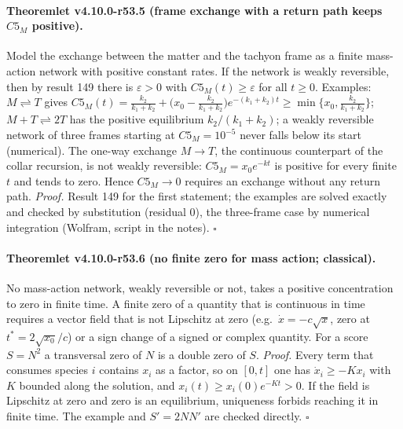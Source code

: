 \paragraph{Theoremlet v4.10.0-r53.5 (frame exchange with a return path keeps \(C5_M\) positive).}
Model the exchange between the matter and the tachyon frame as a finite mass-action network with positive constant rates.  If the network is weakly
reversible, then by result 149 there is \(\varepsilon>0\) with \(C5_M(t)\ge\varepsilon\) for all \(t\ge0\).  Examples: \(M\rightleftharpoons T\) gives
\(C5_M(t)=\tfrac{k_2}{k_1+k_2}+\bigl(x_0-\tfrac{k_2}{k_1+k_2}\bigr)e^{-(k_1+k_2)t}\ge\min\{x_0,\tfrac{k_2}{k_1+k_2}\}\); \(M+T\rightleftharpoons2T\) has the positive equilibrium
\(k_2/(k_1+k_2)\); a weakly reversible network of three frames starting at \(C5_M=10^{-5}\) never falls below its start (numerical).  The one-way exchange
\(M\to T\), the continuous counterpart of the collar recursion, is not weakly reversible: \(C5_M=x_0e^{-kt}\) is positive for every finite \(t\) and tends to
zero.  Hence \(C5_M\to0\) requires an exchange without any return path.
\emph{Proof.} Result 149 for the first statement; the examples are solved exactly and checked by substitution (residual 0), the three-frame case by
numerical integration (Wolfram, script in the notes).  \(\square\)

\paragraph{Theoremlet v4.10.0-r53.6 (no finite zero for mass action; classical).}
No mass-action network, weakly reversible or not, takes a positive concentration to zero in finite time.  A finite zero of a quantity that is
continuous in time requires a vector field that is not Lipschitz at zero (e.g.\ \(\dot x=-c\sqrt x\), zero at \(t^*=2\sqrt{x_0}/c\)) or a sign change of a signed
or complex quantity.  For a score \(S=N^2\) a transversal zero of \(N\) is a double zero of \(S\).
\emph{Proof.} Every term that consumes species \(i\) contains \(x_i\) as a factor, so on \([0,t]\) one has \(\dot x_i\ge-K x_i\) with \(K\) bounded along the solution, and
\(x_i(t)\ge x_i(0)e^{-Kt}>0\).  If the field is Lipschitz at zero and zero is an equilibrium, uniqueness forbids reaching it in finite time.  The example
and \(S'=2NN'\) are checked directly.  \(\square\)

